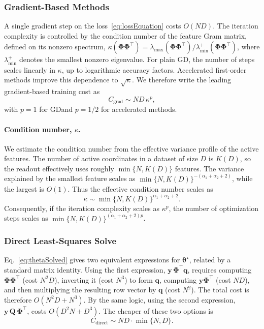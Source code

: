 \documentclass[11pt]{article}
\theoremstyle{plain}
\theoremstyle{definition}
\theoremstyle{remark}
\begin{document}
\subsubsection{Gradient-Based Methods}

A single gradient step on the loss~\eqref{eq:lossEquation} costs $O(ND)$. The iteration complexity is controlled by the condition number of the feature Gram matrix, defined on its nonzero spectrum,
$\kappa(\boldsymbol{\Phi}\boldsymbol{\Phi}^\top)
=
\lambda_{\max}(\boldsymbol{\Phi}\boldsymbol{\Phi}^\top)/
\lambda_{\min}^+(\boldsymbol{\Phi}\boldsymbol{\Phi}^\top)$,
where $\lambda_{\min}^+$ denotes the smallest nonzero eigenvalue.
For plain GD, the number of steps scales linearly in $\kappa$, up to logarithmic accuracy factors. Accelerated first-order methods improve this dependence to $\sqrt{\kappa}$. We therefore write the leading gradient-based training cost as
\begin{equation}
    C_{\mathrm{grad}} \sim ND\,\kappa^p,
\end{equation}
with $p=1$ for GDand $p=1/2$ for accelerated methods.


\paragraph{Condition number, $\kappa$.}
We estimate the condition number from the effective variance profile of the active features. The number of active coordinates in a dataset of size $D$ is $K(D)$, so the readout effectively uses roughly $\min\{N,K(D)\}$ features. The variance explained by the smallest feature scales as $\min\{N,K(D)\}^{-(\alpha_1+\alpha_2+2)}$, while the largest is $O(1)$.
Thus the effective condition number scales as
\begin{equation}
\kappa \sim \min\{N,K(D)\}^{\alpha_1+\alpha_2+2}.
\end{equation}
Consequently, if the iteration complexity scales as \(\kappa^p\), the number of optimization steps scales as $\min\{N,K(D)\}^{(\alpha_1+\alpha_2+2)p}$. 



\subsubsection{Direct Least-Squares Solve}
Eq.~\eqref{eq:thetaSolved} gives two equivalent expressions for $\boldsymbol{\theta}^\star$, related by a standard matrix identity. Using the first expression, $\mathbf{y}\,\boldsymbol{\Phi}^\top \mathbf{q}$, requires computing $\boldsymbol{\Phi}\boldsymbol{\Phi}^\top$ (cost $N^2D$), inverting it (cost $N^3$) to form $\mathbf{q}$, computing $\mathbf{y}\boldsymbol{\Phi}^\top$ (cost $ND$), and then multiplying the resulting row vector by $\mathbf{q}$ (cost $N^2$). The total cost is therefore $O(N^2D+N^3)$. By the same logic, using the second expression, $\mathbf{y}\,\mathbf{Q}\,\boldsymbol{\Phi}^\top$, costs $O(D^2N+D^3)$. The cheaper of these two options is
\[
C_{\mathrm{direct}}  \sim ND \cdot \min\{N,D\}.
\]
\end{document}
